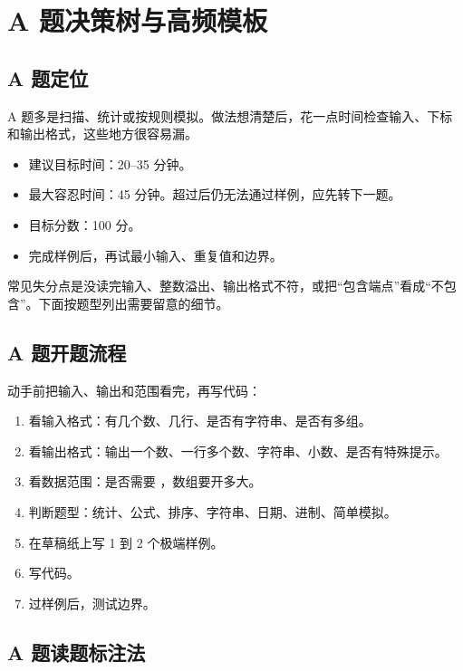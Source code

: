 \chapter{A 题决策树与高频模板}\label{ch:05}

\section{A 题定位}\label{sec:05-1}

A 题多是扫描、统计或按规则模拟。做法想清楚后，花一点时间检查输入、下标和输出格式，这些地方很容易漏。

\begin{itemize}
  \item 建议目标时间：20--35 分钟。
  \item 最大容忍时间：45 分钟。超过后仍无法通过样例，应先转下一题。
  \item 目标分数：100 分。
  \item 完成样例后，再试最小输入、重复值和边界。
\end{itemize}

常见失分点是没读完输入、整数溢出、输出格式不符，或把“包含端点”看成“不包含”。下面按题型列出需要留意的细节。

\section{A 题开题流程}\label{sec:05-2}

动手前把输入、输出和范围看完，再写代码：

\begin{enumerate}
  \item 看输入格式：有几个数、几行、是否有字符串、是否有多组。
  \item 看输出格式：输出一个数、一行多个数、字符串、小数、是否有特殊提示。
  \item 看数据范围：是否需要 ，数组要开多大。
  \item 判断题型：统计、公式、排序、字符串、日期、进制、简单模拟。
  \item 在草稿纸上写 1 到 2 个极端样例。
  \item 写代码。
  \item 过样例后，测试边界。
\end{enumerate}

\section{A 题读题标注法}\label{sec:05-3}


